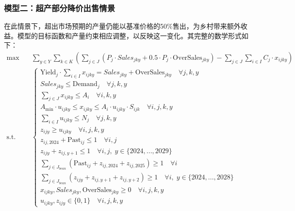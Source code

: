 \subsubsection{模型二：超产部分降价出售情景}
在此情景下，超出市场预期的产量仍能以基准价格的50\%售出，为乡村带来额外收益。模型的目标函数和产量约束相应调整，以反映这一变化。其完整的数学形式如下：
\begin{align}
\max \quad & \sum_{y \in Y} \sum_{k \in K} \left( \sum_{j \in J} (P_j \cdot Sales_{jky} + 0.5 \cdot P_j \cdot \text{OverSales}_{jky}) - \sum_{j \in J} \sum_{i \in I} C_j \cdot x_{ijky} \right) \\
\text{s.t.} \quad & \left\{
    \begin{array}{l}
        \text{Yield}_j \cdot \sum_{i \in I} x_{ijky} = Sales_{jky} + \text{OverSales}_{jky} \quad \forall j,k,y        \\
        Sales_{jky} \le \text{Demand}_j \quad \forall j,k,y                                                          \\
        \sum_{j \in J} x_{ijky} \le A_i \quad \forall i,k,y                                                          \\
        A_{\min} \cdot u_{ijky} \le x_{ijky} \le A_i \cdot u_{ijky} \cdot S_{ijk} \quad \forall i,j,k,y                \\
        \sum_{i \in I} u_{ijky} \le N_j \quad \forall j,k,y                                                          \\
        z_{ijy} \ge u_{ijky} \quad \forall i,j,k,y                                                                   \\
        z_{ij,2024} + \text{Past}_{ij} \le 1 \quad \forall i,j                                                       \\
        z_{ijy} + z_{ij,y+1} \le 1 \quad \forall i,j, \; y \in \{2024,...,2029\}                                      \\
        \sum_{j \in J_{bean}} (\text{Past}_{ij} + z_{ij,2024} + z_{ij,2025}) \ge 1 \quad \forall i                     \\
        \sum_{j \in J_{bean}} (z_{ijy} + z_{ij,y+1} + z_{ij,y+2}) \ge 1 \quad \forall i, \; y \in \{2024,...,2028\}    \\
        x_{ijky}, Sales_{jky}, \text{OverSales}_{jky} \ge 0 \quad \forall i,j,k,y                                     \\
        u_{ijky}, z_{ijy} \in \{0, 1\} \quad \forall i,j,k,y
    \end{array}
    \right.
\end{align}

